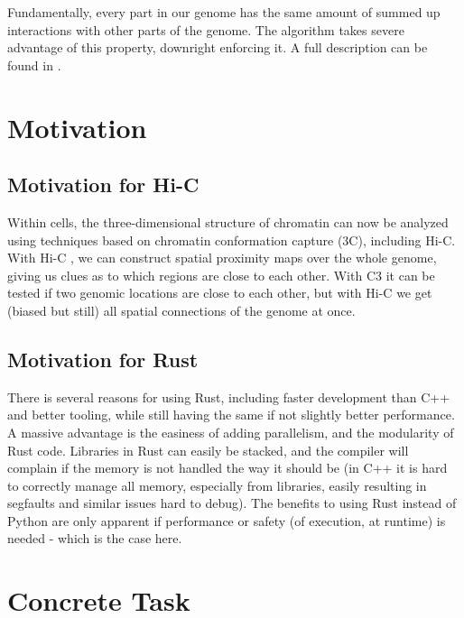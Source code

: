 Fundamentally, every part in our genome has the same amount of summed up
interactions with other parts of the genome. The algorithm takes severe
advantage of this property, downright enforcing it. A full description can be
found in .



\section{Motivation}\label{sec:motivation}

\subsection{Motivation for Hi-C}


Within cells, the three-dimensional structure of chromatin can now be analyzed
using techniques based on chromatin conformation capture (3C), including Hi-C.
With Hi-C , we can construct spatial proximity
maps over the whole genome, giving us clues as to which regions are close to
each other. With C3 it can be tested if two genomic locations are close to each
other, but with Hi-C we get (biased but still) all spatial connections of the
genome at once.

\subsection{Motivation for Rust}

There is several reasons for using Rust, including faster development than C++
and better tooling, while still having the same if not slightly better
performance. A massive advantage is the easiness of adding parallelism, and the
modularity of Rust code. Libraries in Rust can easily be stacked, and the
compiler will complain if the memory is not handled the way it should be (in
C++ it is hard to correctly manage all memory, especially from libraries,
easily resulting in segfaults and similar issues hard to debug). The benefits to
using Rust instead of Python are only apparent if performance or safety (of
execution, at runtime) is needed - which is the case here.






\section{Concrete Task}

